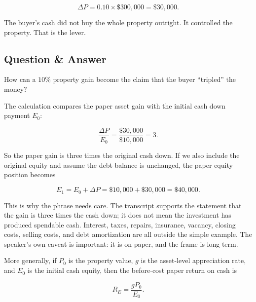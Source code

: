 \begin{equation}
\Delta P = 0.10 \times \$300{,}000 = \$30{,}000.
\end{equation}

The buyer's cash did not buy the whole property outright. It controlled the property. That is the lever.

\subsection{Question \& Answer}

How can a \(10\%\) property gain become the claim that the buyer ``tripled'' the money?

The calculation compares the paper asset gain with the initial cash down payment \(E_0\):

\begin{equation}
\frac{\Delta P}{E_0}
=
\frac{\$30{,}000}{\$10{,}000}
=
3.
\end{equation}

So the paper gain is three times the original cash down. If we also include the original equity and assume the debt balance is unchanged, the paper equity position becomes

\begin{equation}
E_1 = E_0 + \Delta P
=
\$10{,}000 + \$30{,}000
=
\$40{,}000.
\end{equation}

This is why the phrase needs care. The transcript supports the statement that the gain is three times the cash down; it does not mean the investment has produced spendable cash. Interest, taxes, repairs, insurance, vacancy, closing costs, selling costs, and debt amortization are all outside the simple example. The speaker's own caveat is important: it is on paper, and the frame is long term.

More generally, if \(P_0\) is the property value, \(g\) is the asset-level appreciation rate, and \(E_0\) is the initial cash equity, then the before-cost paper return on cash is

\begin{equation}
R_E = \frac{gP_0}{E_0}.
\end{equation}

